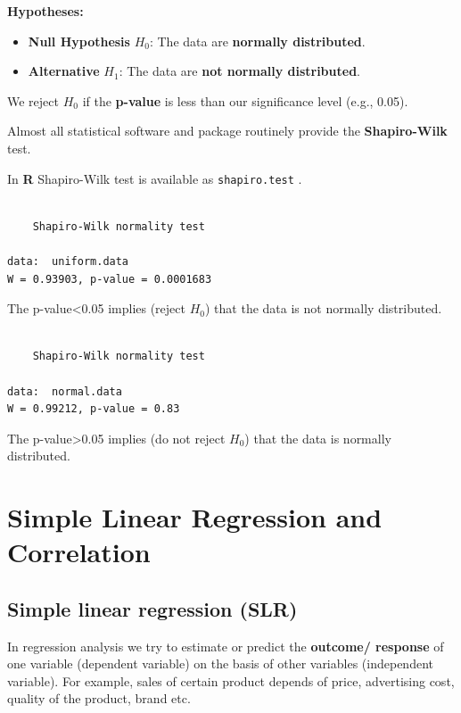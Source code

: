 \documentclass[
  11pt,
  letterpaper,
  DIV=11,
  numbers=noendperiod]{scrreprt}
\begin{document}
\textbf{Hypotheses:}

\begin{itemize}
\item
  \textbf{Null Hypothesis} \(H_0\): The data are \textbf{normally
  distributed}.
\item
  \textbf{Alternative} \(H_1\): The data are \textbf{not normally
  distributed}.
\end{itemize}

We reject \(H_0\) if the \textbf{p-value} is less than our significance
level (e.g., 0.05).

Almost all statistical software and package routinely provide the
\textbf{Shapiro-Wilk} test.

In \textbf{R} Shapiro-Wilk test is available as \texttt{shapiro.test} .

\begin{verbatim}

    Shapiro-Wilk normality test

data:  uniform.data
W = 0.93903, p-value = 0.0001683
\end{verbatim}

The p-value\textless0.05 implies (reject \(H_0\)) that the data is not
normally distributed.

\begin{verbatim}

    Shapiro-Wilk normality test

data:  normal.data
W = 0.99212, p-value = 0.83
\end{verbatim}

The p-value\textgreater0.05 implies (do not reject \(H_0\)) that the
data is normally distributed.


\chapter{Simple Linear Regression and
Correlation}\label{simple-linear-regression-and-correlation}

\section{Simple linear regression
(SLR)}\label{simple-linear-regression-slr}

In regression analysis we try to estimate or predict the
\textbf{outcome/ response} of one variable (dependent variable) on the
basis of other variables (independent variable). For example, sales of
certain product depends of price, advertising cost, quality of the
product, brand etc.
\end{document}

